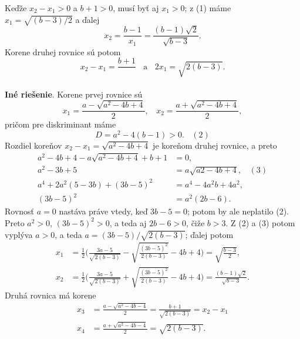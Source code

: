 \documentclass[11pt,a4paper,oneside,final]{book}
\begin{document}
Keďže $x_2 - x_1 > 0$ a $b + 1 > 0$, musí byť aj $x_1 > 0$; z (1) máme $x_1 =\sqrt{(b - 3)/2}$ a ďalej
$$x_2 =\frac{b-1}{x_1}=\frac{(b - 1)\sqrt{2}}{\sqrt{b-3}}.$$
Korene druhej rovnice sú potom
$$x_2 - x_1 = \frac{b+1}{} \ \ \ \ \text{a} \ \ \ \  2x_1=\sqrt{2(b - 3)}.$$
\\
\textbf{Iné riešenie}. Korene prvej rovnice sú
$$x_1 = \frac{a -\sqrt{a^2 - 4b + 4}}{2}, \ \ \ \  x_2 =\frac{a +\sqrt{a^2 - 4b + 4}}{2},$$
pričom pre diskriminant máme
$$D = a^2 - 4(b - 1) > 0. \ \ \ \  (2)$$
Rozdiel koreňov $x_2 - x_1 =\sqrt{a^2 - 4b + 4}$ je koreňom druhej rovnice, a preto
\begin{align*}
a^2 - 4b + 4 - a \sqrt{a^2 - 4b + 4} + b + 1 &= 0,\\
a^2 - 3b + 5 &= a\sqrt{a 2 - 4b + 4}, \ \ \ \  (3)\\
a^4 + 2a^2 (5 - 3b) + (3b - 5)^2 &= a^4 - 4a^2 b + 4a^2,\\
(3b - 5)^2 &= a^2 (2b - 6).
\end{align*}
Rovnosť  $a = 0$ nastáva práve vtedy, keď $3b - 5 = 0$; potom by ale neplatilo (2). Preto $a^2 > 0$, $(3b - 5)^2 > 0$, a teda aj $2b - 6 > 0$, čiže $b > 3$. Z (2) a (3) potom vyplýva $a > 0$, a teda $a = (3b - 5)/\sqrt{2(b - 3)}$; ďalej potom
\begin{align*}
x_1 &=\frac{1}{2}\bigg( \frac{3a-5}{\sqrt{2(b-3)}}-\sqrt{\frac{(3b-5)^2}{2(b-3)}}-4b+4\bigg)=\sqrt{\frac{b-3}{2}},\\
x_2 &=\frac{1}{2} \bigg( \frac{3a-5}{\sqrt{2(b-3)}}+\sqrt{\frac{(3b-5)^2}{2(b-3)}}-4b+4\bigg)=\frac{(b-1)\sqrt{2}}{\sqrt{b-3}}.
\end{align*}
Druhá rovnica má korene
\begin{align*}
x_3 &=\frac{a-\sqrt{a^2-4b-4}}{2}=\frac{b+1}{\sqrt{2(b-3)}}=x_2-x_1\\
x_4 &=\frac{a+\sqrt{a^2-4b-4}}{2}=\sqrt{2(b-3)}.
\end{align*}
\end{document}
